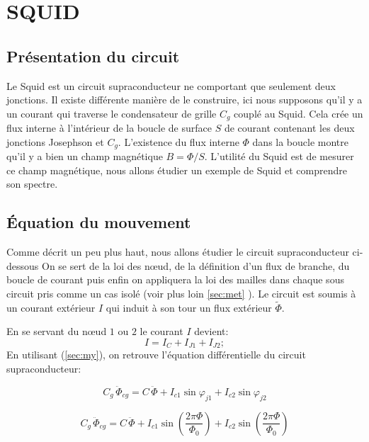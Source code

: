 
\section{SQUID}
\label{sec:s}
\subsection{Présentation du circuit}
Le Squid est un circuit supraconducteur ne comportant que seulement deux jonctions. Il existe différente manière de le construire, ici nous supposons  qu'il y a un courant qui traverse le condensateur de grille $C_g$ couplé au Squid. Cela crée un flux interne à l'intérieur de la boucle de surface $S$ de courant contenant les deux jonctions Josephson et $C_g$. L'existence du flux interne $\Phi$ dans la boucle montre qu'il y a bien un champ magnétique $B=\Phi/S$. L'utilité du Squid est de mesurer ce champ magnétique, nous allons étudier un exemple de Squid et comprendre son spectre.


\subsection{Équation du mouvement}
 Comme  décrit un peu plus haut, nous allons étudier le circuit supraconducteur ci-dessous%
On se sert de la loi des n\oe ud, de la définition d'un flux de branche, du boucle de courant puis enfin on appliquera la loi des mailles dans chaque sous circuit pris comme un cas isolé (voir plus loin \ref{sec:met} ). Le circuit est soumis à un courant extérieur $I$ qui induit à son tour un flux extérieur $\tilde{\Phi}$. 

En se servant du n\oe ud $1$ ou $2$ le courant $I$ devient:
\begin{equation}
I=I_C+I_{J1}+I_{J2};
\label{sec:j}
\end{equation}
En utilisant (\ref{sec:my}), on retrouve l'équation différentielle du circuit supraconducteur:

\begin{equation}
C_g \, \ddot{\Phi}_{cg}
= C \, \ddot{\Phi}
+ I_{c1} \sin \varphi_{j1}
+ I_{c2} \sin \varphi_{j2}
\label{sec:x}
\end{equation}

\begin{equation}
C_g \, \ddot{\Phi}_{cg}
= C \, \ddot{\Phi}
+ I_{c1} \sin\!\left(\frac{2\pi \Phi}{\Phi_0}\right)
+ I_{c2} \sin\!\left(\frac{2\pi \Phi}{\Phi_0}\right)
\end{equation}

